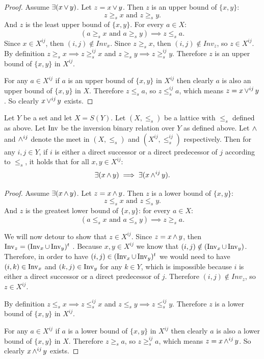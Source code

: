 	\begin{proof}
		Assume $\exists(x \operatorname{\vee} y)$. Let $z = x \operatorname{\vee} y$. Then $z$ is an upper bound of $\{x, y\}$:
		\[
			z \ge_s x \textrm{ and } z \ge_s y.
		\]
		And $z$ is the least upper bound of $\{x, y\}$. For every $a \in X$:
		\[
			(a \ge_s x \textrm{ and } a \ge_s y) \implies z \le_s a.
		\]
		Since $x \in X^{ij}$, then $(i, j) \notin Inv_x$. Since $z \ge_s x$, then $(i, j) \notin Inv_z$, so $z \in X^{ij}$. By definition $z \ge_s x \implies z \ge^{ij}_s x$ and $z \ge_s y \implies z \ge^{ij}_s y$. Therefore $z$ is an upper bound of $\{x, y\}$ in $X^{ij}$.

		For any $a \in X^{ij}$ if $a$ is an upper bound of $\{x, y\}$ in $X^{ij}$ then clearly $a$ is also an upper bound of $\{x, y\}$ in $X$. Therefore $z \le_s a$, so $z \le^{ij}_s a$, which means $z = x \operatorname{\vee}^{ij} y$. So clearly $x \operatorname{\vee}^{ij} y$ exists.
	\end{proof}

	\begin{lemma}
		\label{identified-permutation-lattice-meet}
		Let $Y$ be a set and let $X = S(Y)$. Let $(X, \le_s)$ be a lattice with $\le_s$ defined as above. Let $\operatorname{Inv}$ be the inversion binary relation over $Y$ as defined above. Let $\operatorname{\wedge}$ and $\operatorname{\wedge}^{ij}$ denote the meet in $(X, \le_s)$ and $(X^{ij}, \le^{ij}_s)$ respectively. Then for any $i,j \in Y$, if $i$ is either a direct successor or a direct predecessor of $j$ according to $\le_s$, it holds that for all $x, y \in X^{ij}$:
		\[
			\exists(x \operatorname{\wedge} y) \implies \exists(x \operatorname{\wedge}^{ij} y).
		\]
	\end{lemma}

	\begin{proof}
		Assume $\exists(x \operatorname{\wedge} y)$. Let $z = x \operatorname{\wedge} y$. Then $z$ is a lower bound of $\{x, y\}$:
		\[
			z \le_s x \textrm{ and } z \le_s y.
		\]
		And $z$ is the greatest lower bound of $\{x, y\}$: for every $a \in X$:
		\[
			(a \le_s x \textrm{ and } a \le_s y) \implies z \ge_s a.
		\]

		We will now detour to show that $z \in X^{ij}$. Since $z = x \operatorname{\wedge} y$, then $\operatorname{Inv}_z = (\operatorname{Inv}_x \cup \operatorname{Inv}_y)^t$ \cite{markowsky1994permutation}. Because $x,y \in X^{ij}$ we know that $(i, j) \notin (\operatorname{Inv}_x \cup \operatorname{Inv}_y)$. Therefore, in order to have $(i, j) \in (\operatorname{Inv}_x \cup \operatorname{Inv}_y)^t$ we would need to have $(i, k) \in \operatorname{Inv}_x$ and $(k, j) \in \operatorname{Inv}_y$ for any $k \in Y$, which is impossible because $i$ is either a direct successor or a direct predecessor of $j$. Therefore $(i, j) \notin Inv_z$, so $z \in X^{ij}$.

		By definition $z \le_s x \implies z \le^{ij}_s x$ and $z \le_s y \implies z \le^{ij}_s y$. Therefore $z$ is a lower bound of $\{x, y\}$ in $X^{ij}$.

		For any $a \in X^{ij}$ if $a$ is a lower bound of $\{x, y\}$ in $X^{ij}$ then clearly $a$ is also a lower bound of $\{x, y\}$ in $X$. Therefore $z \ge_s a$, so $z \ge^{ij}_s a$, which means $z = x \operatorname{\wedge}^{ij} y$. So clearly $x \operatorname{\wedge}^{ij} y$ exists.
	\end{proof}

